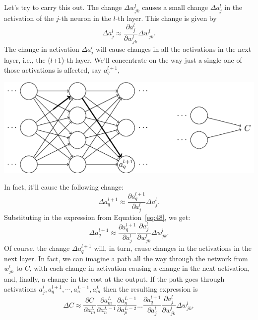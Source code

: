 \documentclass[a4paper,twoside,10pt]{book}
\begin{document}
Let's try to carry this out. The change $\Delta{}w^l_{jk}$ causes a small change $\Delta{}a^l_j$ in the activation of the $j$-th neuron in the $l$-th layer. This change is given by
\begin{equation}
	\Delta a^l_j \approx \frac{\partial a^l_j}{\partial w^l_{jk}} \Delta w^l_{jk}.
	\tag{48}\label{eq:48}
\end{equation}
The change in activation $\Delta{}a^l_j$ will cause changes in all the activations in the next layer, i.e., the ($l$+1)-th layer. We'll concentrate on the way just a single one of those activations is affected, say $a^{l+1}_q$,
\begin{center}
	\includegraphics[scale=0.5]{./figures/ch2/tikz26}
\end{center}
In fact, it'll cause the following change:
\begin{equation}
	\Delta a^{l+1}_q \approx \frac{\partial a^{l+1}_q}{\partial a^l_j} \Delta a^l_j.
	\tag{49}\label{eq:49}
\end{equation}%
Substituting in the expression from Equation~\ref{eq:48}, we get:
\begin{equation}
	\Delta a^{l+1}_q \approx \frac{\partial a^{l+1}_q}{\partial a^l_j} \frac{\partial a^l_j}{\partial w^l_{jk}} \Delta w^l_{jk}.
	\tag{50}\label{eq:50}
\end{equation}
Of course, the change $\Delta{}a^{l+1}_q$ will, in turn, cause changes in the activations in the next layer. In fact, we can imagine a path all the way through the network from $w^l_{jk}$ to $C$, with each change in activation causing a change in the next activation, and, finally, a change in the cost at the output. If the path goes through activations $a^l_j,a^{l+1}_q,\cdots,a^{L-1}_n,a^L_m$ then the resulting expression is
\begin{equation}
	\Delta C \approx \frac{\partial C}{\partial a^L_m} 
	\frac{\partial a^L_m}{\partial a^{L-1}_n}
	\frac{\partial a^{L-1}_n}{\partial a^{L-2}_p} \ldots
	\frac{\partial a^{l+1}_q}{\partial a^l_j}
	\frac{\partial a^l_j}{\partial w^l_{jk}} \Delta w^l_{jk},
	\tag{51}\label{eq:51}
\end{equation}
\end{document}
